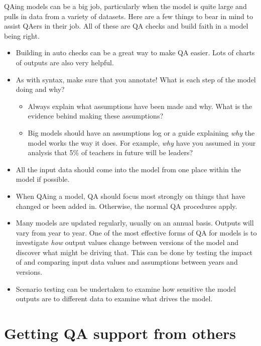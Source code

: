 \documentclass[
]{article}
\providecommand{\tightlist}{%
  \setlength{\itemsep}{0pt}\setlength{\parskip}{0pt}}
\begin{document}
QAing models can be a big job, particularly when the model is quite large and pulls in data from a variety of datasets. Here are a few things to bear in mind to assist QAers in their job. All of these are QA checks and build faith in a model being right.

\begin{itemize}
\item
  Building in auto checks can be a great way to make QA easier. Lots of charts of outputs are also very helpful.
\item
  As with syntax, make sure that you annotate! What is each step of the model doing and why?

  \begin{itemize}
  \tightlist
  \item
    Always explain what assumptions have been made and why. What is the evidence behind making these assumptions?
  \item
    Big models should have an assumptions log or a guide explaining \emph{why} the model works the way it does. For example, \emph{why} have you assumed in your analysis that 5\% of teachers in future will be leaders?
  \end{itemize}
\item
  All the input data should come into the model from one place within the model if possible.
\item
  When QAing a model, QA should focus most strongly on things that have changed or been added in. Otherwise, the normal QA procedures apply.
\item
  Many models are updated regularly, usually on an annual basis. Outputs will vary from year to year. One of the most effective forms of QA for models is to investigate \emph{how} output values change between versions of the model and discover what might be driving that. This can be done by testing the impact of and comparing input data values and assumptions between years and versions.
\item
  Scenario testing can be undertaken to examine how sensitive the model outputs are to different data to examine what drives the model.
\end{itemize}

\hypertarget{getting-qa-support-from-others}{%
\section{Getting QA support from others}\label{getting-qa-support-from-others}}
\end{document}
